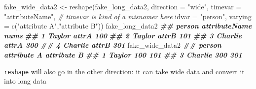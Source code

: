 \documentclass[
  12pt,
]{krantz}
\makeatletter
\newenvironment{Shaded}{\begin{snugshade}}{\end{snugshade}}
\newcommand{\AttributeTok}[1]{\textcolor[rgb]{0.61,0.61,0.61}{#1}}
\newcommand{\CommentTok}[1]{\textcolor[rgb]{0.37,0.37,0.37}{\textit{#1}}}
\newcommand{\DocumentationTok}[1]{\textcolor[rgb]{0.37,0.37,0.37}{\textbf{\textit{#1}}}}
\newcommand{\FunctionTok}[1]{\textcolor[rgb]{0,0,0}{#1}}
\newcommand{\NormalTok}[1]{#1}
\newcommand{\OtherTok}[1]{\textcolor[rgb]{0.37,0.37,0.37}{#1}}
\newcommand{\StringTok}[1]{\textcolor[rgb]{0.5,0.5,0.5}{#1}}
\newenvironment{kframe}{%
\medskip{}
\setlength{\fboxsep}{.8em}
 \def\at@end@of@kframe{}%
 \ifinner\ifhmode%
  \def\at@end@of@kframe{\end{minipage}}%
  \begin{minipage}{\columnwidth}%
 \fi\fi%
 \def\FrameCommand##1{\hskip\@totalleftmargin \hskip-\fboxsep
 \colorbox{shadecolor}{##1}\hskip-\fboxsep
     \hskip-\linewidth \hskip-\@totalleftmargin \hskip\columnwidth}%
 \MakeFramed {\advance\hsize-\width
   \@totalleftmargin\z@ \linewidth\hsize
   \@setminipage}}%
 {\par\unskip\endMakeFramed%
 \at@end@of@kframe}
\renewenvironment{Shaded}{\begin{kframe}}{\end{kframe}}
\makeatother
\begin{document}
\begin{Shaded}
\begin{Highlighting}[]
\NormalTok{fake\_wide\_data2 }\OtherTok{\textless{}{-}} \FunctionTok{reshape}\NormalTok{(fake\_long\_data2, }
                           \AttributeTok{direction =} \StringTok{"wide"}\NormalTok{, }
                           \AttributeTok{timevar =} \StringTok{"attributeName"}\NormalTok{, }\CommentTok{\# timevar is kind of a misnomer here}
                           \AttributeTok{idvar =} \StringTok{"person"}\NormalTok{, }
                           \AttributeTok{varying =} \FunctionTok{c}\NormalTok{(}\StringTok{"attribute A"}\NormalTok{,}\StringTok{"attribute B"}\NormalTok{)) }
\NormalTok{fake\_long\_data2}
\DocumentationTok{\#\#    person attributeName nums}
\DocumentationTok{\#\# 1  Taylor         attrA  100}
\DocumentationTok{\#\# 2  Taylor         attrB  101}
\DocumentationTok{\#\# 3 Charlie         attrA  300}
\DocumentationTok{\#\# 4 Charlie         attrB  301}
\NormalTok{fake\_wide\_data2}
\DocumentationTok{\#\#    person attribute A attribute B}
\DocumentationTok{\#\# 1  Taylor         100         101}
\DocumentationTok{\#\# 3 Charlie         300         301}
\end{Highlighting}
\end{Shaded}

\texttt{reshape} will also go in the other direction: it can take wide data and convert it into long data
\end{document}
